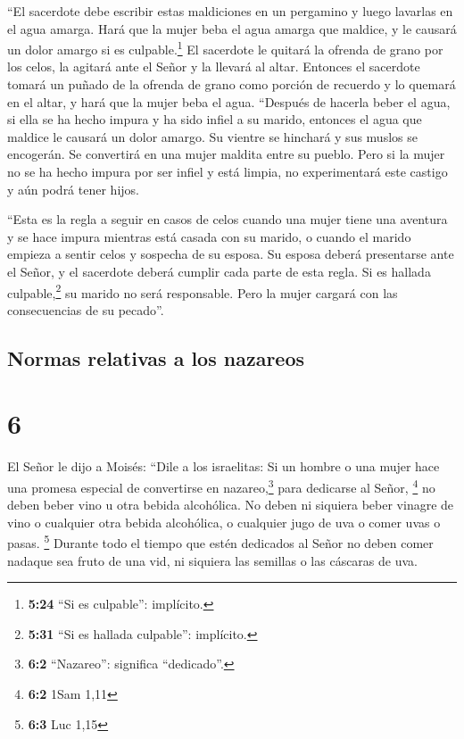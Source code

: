  ``El sacerdote debe escribir estas maldiciones en un
pergamino y luego lavarlas en el agua amarga.  Hará que
la mujer beba el agua amarga que maldice, y le causará un dolor amargo
si es culpable.\footnote{\textbf{5:24} ``Si es culpable'': implícito.}
 El sacerdote le quitará la ofrenda de grano por los
celos, la agitará ante el Señor y la llevará al altar. 
Entonces el sacerdote tomará un puñado de la ofrenda de grano como
porción de recuerdo y lo quemará en el altar, y hará que la mujer beba
el agua.  ``Después de hacerla beber el agua, si ella se
ha hecho impura y ha sido infiel a su marido, entonces el agua que
maldice le causará un dolor amargo. Su vientre se hinchará y sus muslos
se encogerán. Se convertirá en una mujer maldita entre su pueblo.
 Pero si la mujer no se ha hecho impura por ser infiel y
está limpia, no experimentará este castigo y aún podrá tener hijos.

 ``Esta es la regla a seguir en casos de celos cuando una
mujer tiene una aventura y se hace impura mientras está casada con su
marido,  o cuando el marido empieza a sentir celos y
sospecha de su esposa. Su esposa deberá presentarse ante el Señor, y el
sacerdote deberá cumplir cada parte de esta regla.  Si es
hallada culpable,\footnote{\textbf{5:31} ``Si es hallada culpable'':
  implícito.} su marido no será responsable. Pero la mujer cargará con
las consecuencias de su pecado''.

\hypertarget{normas-relativas-a-los-nazareos}{%
\subsection{Normas relativas a los
nazareos}\label{normas-relativas-a-los-nazareos}}

\hypertarget{section-5}{%
\section{6}\label{section-5}}

 El Señor le dijo a Moisés:  ``Dile a los
israelitas: Si un hombre o una mujer hace una promesa especial de
convertirse en nazareo,\footnote{\textbf{6:2} ``Nazareo'': significa
  ``dedicado''.} para dedicarse al Señor, \footnote{\textbf{6:2} 1Sam
  1,11}  no deben beber vino u otra bebida alcohólica. No
deben ni siquiera beber vinagre de vino o cualquier otra bebida
alcohólica, o cualquier jugo de uva o comer uvas o pasas. \footnote{\textbf{6:3}
  Luc 1,15}  Durante todo el tiempo que estén dedicados al
Señor no deben comer nadaque sea fruto de una vid, ni siquiera las
semillas o las cáscaras de uva.

